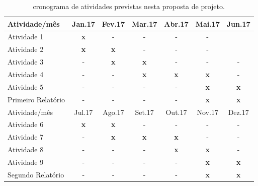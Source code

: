 \documentclass[12pt]{article}
\begin{document}
\begin{table}[!ht]
\caption{cronograma de atividades previstas nesta proposta de projeto.} 
\label{tab:cronograma}
\begin{center}
\smallskip
\begin{tabular}{l ccc ccc}
    \toprule
    \small Atividade/mês & \small Jan.17 & \small Fev.17 & \small Mar.17
                         & \small Abr.17 & \small Mai.17 & \small Jun.17
    \\ \hline

    \small Atividade 1   
    & \small {\bf x} & \small - & \small - & \small - & \small - \\

    \small Atividade 2   
    & \small {\bf x} & \small {\bf x} & \small - & \small - 
    & \small - \\

    \small Atividade 3   
    & \small - & \small {\bf x} & \small {\bf x} & \small - & \small -
    & \small - \\

    \small Atividade 4
    & \small - & \small - & \small {\bf x} & \small {\bf x} 
    & \small {\bf x} &  \small - \\

    \small Atividade 5   
    & \small - & \small - & \small - & \small - & \small {\bf x} 
    & \small {\bf x} \\

    \small Primeiro Relatório  
    & \small - & \small - & \small - & \small - & \small {\bf x} 
    & \small {\bf x} \\
    \bottomrule
    \toprule
    \small Atividade/mês & \small Jul.17 & \small Ago.17 & \small Set.17
                         & \small Out.17 & \small Nov.17 & \small Dez.17
    \\ \hline

    \small Atividade 6   
    & \small {\bf x} & \small {\bf x} & \small - & \small - & \small - 
    & \small - \\

    \small Atividade 7
    & \small - & \small {\bf x} & \small {\bf x} & \small{\bf x} 
    & \small - &  \small -\\

    \small Atividade 8  
    & \small - & \small - & \small - & \small {\bf x} & \small {\bf x} 
    & \small - \\

    \small Atividade 9
    & \small - & \small - & \small - & \small - & \small {\bf x} 
    & \small {\bf x}\\

    \small Segundo Relatório
    & \small - & \small - & \small - & \small - & \small {\bf x} 
    & \small {\bf x}\\
    \bottomrule
\end{tabular}
\end{center}
\end{table}
\end{document}
